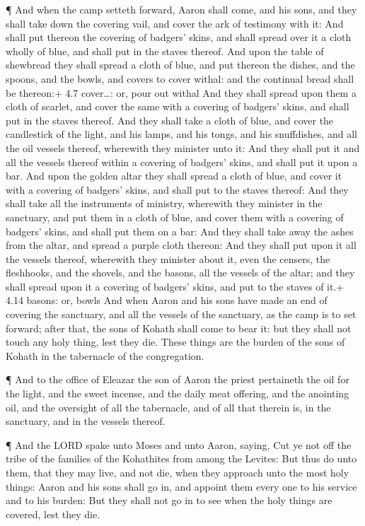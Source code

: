  ¶ And when the camp setteth forward, Aaron shall come, and
his sons, and they shall take down the covering vail, and cover the ark
of testimony with it:  And shall put thereon the covering of
badgers' skins, and shall spread over it a cloth wholly of blue, and
shall put in the staves thereof.  And upon the table of
shewbread they shall spread a cloth of blue, and put thereon the dishes,
and the spoons, and the bowls, and covers to cover withal: and the
continual bread shall be thereon:+ 4.7 cover\ldots: or, pour out withal
 And they shall spread upon them a cloth of scarlet, and
cover the same with a covering of badgers' skins, and shall put in the
staves thereof.  And they shall take a cloth of blue, and
cover the candlestick of the light, and his lamps, and his tongs, and
his snuffdishes, and all the oil vessels thereof, wherewith they
minister unto it:  And they shall put it and all the
vessels thereof within a covering of badgers' skins, and shall put it
upon a bar.  And upon the golden altar they shall spread a
cloth of blue, and cover it with a covering of badgers' skins, and shall
put to the staves thereof:  And they shall take all the
instruments of ministry, wherewith they minister in the sanctuary, and
put them in a cloth of blue, and cover them with a covering of badgers'
skins, and shall put them on a bar:  And they shall take
away the ashes from the altar, and spread a purple cloth thereon:
 And they shall put upon it all the vessels thereof,
wherewith they minister about it, even the censers, the fleshhooks, and
the shovels, and the basons, all the vessels of the altar; and they
shall spread upon it a covering of badgers' skins, and put to the staves
of it.+ 4.14 basons: or, bowls  And when Aaron and his sons
have made an end of covering the sanctuary, and all the vessels of the
sanctuary, as the camp is to set forward; after that, the sons of Kohath
shall come to bear it: but they shall not touch any holy thing, lest
they die. These things are the burden of the sons of Kohath in the
tabernacle of the congregation.

 ¶ And to the office of Eleazar the son of Aaron the priest
pertaineth the oil for the light, and the sweet incense, and the daily
meat offering, and the anointing oil, and the oversight of all the
tabernacle, and of all that therein is, in the sanctuary, and in the
vessels thereof.

 ¶ And the LORD spake unto Moses and unto Aaron, saying,
 Cut ye not off the tribe of the families of the Kohathites
from among the Levites:  But thus do unto them, that they
may live, and not die, when they approach unto the most holy things:
Aaron and his sons shall go in, and appoint them every one to his
service and to his burden:  But they shall not go in to see
when the holy things are covered, lest they die.

